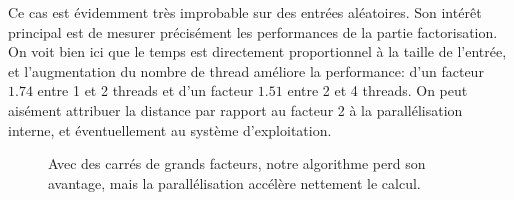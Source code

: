 \documentclass[a4paper,10pt]{article}
\begin{document}
Ce cas est évidemment très improbable sur des entrées aléatoires. Son intérêt principal est de mesurer précisément les performances de la partie factorisation. On voit bien ici que le temps est directement proportionnel à la taille de l'entrée, et l'augmentation du nombre de thread améliore la performance: d'un facteur $1.74$ entre 1 et 2 threads et d'un facteur $1.51$ entre 2 et 4 threads. On peut aisément attribuer la distance par rapport au facteur 2 à la parallélisation interne, et éventuellement au système d'exploitation.

\begin{figure}[t!]
    \centering
    \caption{Avec des carrés de grands facteurs, notre algorithme perd son avantage, mais la parallélisation accélère nettement le calcul.}
    \label{fig:large-prime-squares}
\end{figure}
\end{document}
